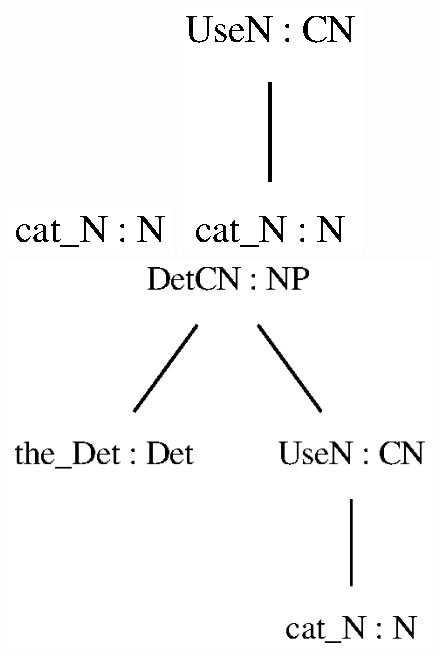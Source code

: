 \begin{figure}[H]
    \centering
        {\includegraphics[scale=0.75]{figure/black_cats/cat_N_gf.eps}}
        {\includegraphics[scale=0.75]{figure/black_cats/cat_CN_gf.eps}}
        {\includegraphics[scale=0.75]{figure/black_cats/the_cat_NP_gf.eps}}

\end{figure}
